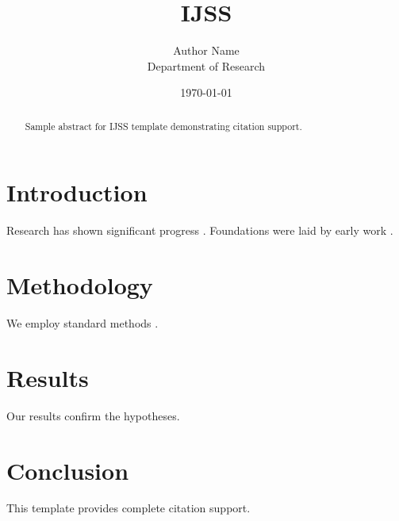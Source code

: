 ﻿\documentclass{elsarticle}
\title{IJSS}
\author{Author Name \\ \small Department of Research}
\date{\today}
\begin{document}
\maketitle

\begin{abstract}
Sample abstract for IJSS template demonstrating citation support.
\end{abstract}

\section{Introduction}
Research has shown significant progress \citep{einstein1905}. Foundations were laid by early work \citep{turing1950}.

\section{Methodology}
We employ standard methods \citep{knuth1984}.

\section{Results}
Our results confirm the hypotheses.

\section{Conclusion}
This template provides complete citation support.



\end{document}
